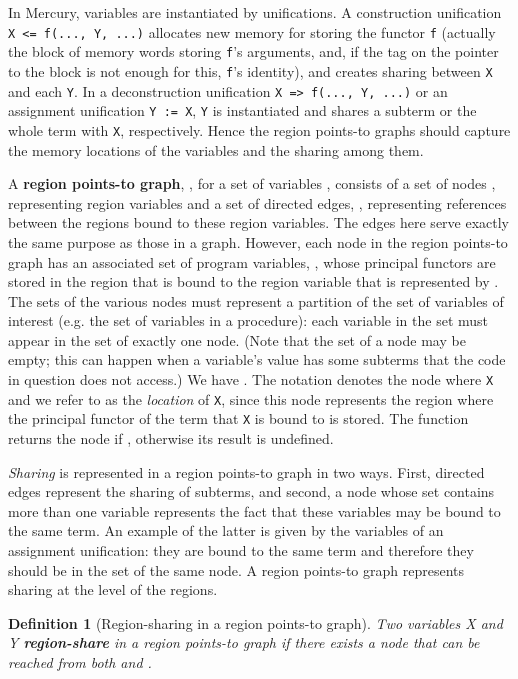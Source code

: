 \documentclass{tlp}
\newtheorem{definition}{Definition} \newtheorem{example}{Example} \let\from=\leftarrow
\newcommand{\code}[1]{{\tt#1}}
\begin{document}
In Mercury, variables are instantiated by unifications.
A construction unification \code{X <= f(..., Y, ...)}
allocates new memory for storing the functor \code{f}
(actually the block of memory words storing \code{f}'s arguments,
and, if the tag on the pointer to the block is not enough for this,
\code{f}'s identity),
and creates sharing between \code{X} and each \code{Y}.
In a deconstruction unification \code{X => f(..., Y, ...)}
or an assignment unification \code{Y := X},
\code{Y} is instantiated and shares a subterm or the whole term with \code{X},
respectively.
Hence the region points-to graphs should capture
the memory locations of the variables and the sharing among them.

A {\bf region points-to graph}, , for a set of variables ,
consists of a set of nodes , representing region variables and
a set of directed edges, , representing references between the regions
bound to these region variables.
The edges here serve exactly the same purpose as those in a  graph.
However, each node  in the region points-to graph
has an associated set of program variables, ,
whose principal functors are stored in the region
that is bound to the region variable that is represented by .
The  sets of the various nodes
must represent a partition of the set of variables of interest
(e.g. the set of variables in a procedure):
each variable in the set must appear in the  set of exactly one node.
(Note that the  set of a node may be empty;
this can happen when a variable's value has some subterms
that the code in question does not access.)
We have \textstyle
\bigcup \atop {}.
The notation  denotes the node where \code{X} 
and we refer to  as the \emph{location} of \code{X},
since this node represents the region where
the principal functor of the term that \code{X} is bound to is stored.
The function 
returns the node  if ,
otherwise its result is undefined.

\emph{Sharing} is represented in a region points-to graph in two ways.
First, directed edges represent the sharing of subterms,
and second, a node whose  set contains more than one variable
represents the fact that these variables may be bound to the same term.
An example of the latter is given by
the variables of an assignment unification:
they are bound to the same term and
therefore they should be in the  set of the same node.
A region points-to graph represents sharing at the level of the regions.

\begin{definition}[Region-sharing in a region points-to graph]
\label{definition:region-sharing}
Two variables X and Y {\bf region-share} in a region points-to graph
if there exists a node that can be reached from both  and .
\end{definition}
\end{document}
